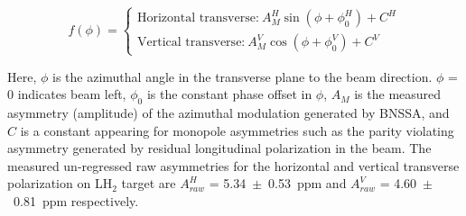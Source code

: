 \begin{equation} \label{equ:eqFitTransverse}
f(\phi) = \left\lbrace 
\begin{aligned}
\text{Horizontal transverse:}~A_{M}^{H} \sin(\phi + \phi_{0}^{H}) + C^{H}\\
\text{Vertical transverse:}~A_{M}^{V} \cos(\phi + \phi_{0}^{V}) + C^{V}
\end{aligned}
\right.
\end{equation}

Here, $\phi$ is the azimuthal angle in the transverse plane to the beam direction. $\phi$ = 0 indicates beam left, $\phi_{0}$ is the constant phase offset in $\phi$, $A_{M}$ is the measured asymmetry (amplitude) of the azimuthal modulation generated by BNSSA, and $C$ is a constant appearing for monopole asymmetries such as the parity violating asymmetry generated by residual longitudinal polarization in the beam. The measured un-regressed raw asymmetries for the horizontal and vertical transverse polarization on LH$_{2}$ target are $A_{raw}^{H}$ = 5.34~$\pm$~0.53~ppm and $A_{raw}^{V}$ = 4.60~$\pm$~0.81~ppm respectively. 



